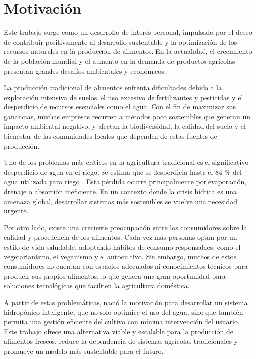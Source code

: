 
\section{Motivación}

Este trabajo surge como un desarrollo de interés personal, impulsado por el deseo de contribuir positivamente al desarrollo sustentable y la optimización de los recursos naturales en la producción de alimentos. En la actualidad, el crecimiento de la población mundial y el aumento en la demanda de productos agrícolas presentan grandes desafíos ambientales y económicos.

La producción tradicional de alimentos enfrenta dificultades debido a la explotación intensiva de suelos, el uso excesivo de fertilizantes y pesticidas y el desperdicio de recursos esenciales como el agua. Con el fin de maximizar sus ganancias, muchas empresas recurren a métodos poco sostenibles que generan un impacto ambiental negativo, y afectan la biodiversidad, la calidad del suelo y el bienestar de las comunidades locales que dependen de estas fuentes de producción.

Uno de los problemas más críticos en la agricultura tradicional es el significativo desperdicio de agua en el riego. Se estima que se desperdicia hasta el 84 \% del agua utilizada para riego \cite{CLARIN}. Esta pérdida ocurre principalmente por evaporación, drenaje o absorción ineficiente. En un contexto donde la crisis hídrica es una amenaza global, desarrollar sistemas más sostenibles se vuelve una necesidad urgente.

Por otro lado, existe una creciente preocupación entre los consumidores sobre la calidad y procedencia de los alimentos. Cada vez más personas optan por un estilo de vida saludable, adoptando hábitos de consumo responsables, como el vegetarianismo, el veganismo y el autocultivo. Sin embargo, muchos de estos consumidores no cuentan con espacios adecuados ni conocimientos técnicos para producir sus propios alimentos, lo que genera una gran oportunidad para soluciones tecnológicas que faciliten la agricultura doméstica.

A partir de estas problemáticas, nació la motivación para desarrollar un sistema hidropónico inteligente, que no solo optimice el uso del agua, sino que también permita una gestión eficiente del cultivo con mínima intervención del usuario. Este trabajo ofrece una alternativa viable y escalable para la producción de alimentos frescos, reduce la dependencia de sistemas agrícolas tradicionales y promueve un modelo más sustentable para el futuro.


